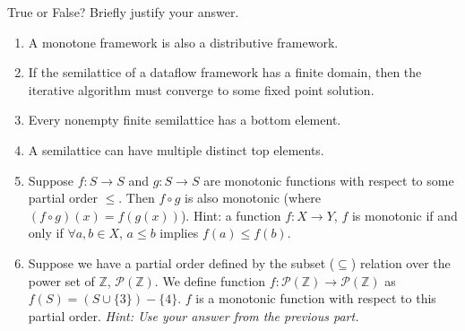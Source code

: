 \begin{problem}
True or False? Briefly justify your answer.
\begin{enumerate}
	\item A monotone framework is also a distributive framework.
	\item If the semilattice of a dataflow framework has a finite domain, then the iterative algorithm must converge to some fixed point solution.
	\item Every nonempty finite semilattice has a bottom element.
	\item A semilattice can have multiple distinct top elements.
	\item Suppose $f : S \to S$ and $g : S \to S$ are monotonic functions with respect to some partial order $\le$. Then $f \circ g$ is also monotonic (where $(f \circ g)(x) = f(g(x))$).
	      Hint: a function $f : X \to Y$, $f$ is monotonic if and only if $\forall a, b \in X$, $a \le b$ implies $f(a) \le f(b)$.
	\item Suppose we have a partial order defined by the subset ($\subseteq$) relation over the power set of $\mathbb{Z}$, $\mathcal{P}(\mathbb{Z})$. We define function $f : \mathcal{P}(\mathbb{Z}) \to \mathcal{P}(\mathbb{Z})$ as $f(S) = (S \cup \{3\}) - \{4\}$. $f$ is a monotonic function with respect to this partial order. \emph{Hint: Use your answer from the previous part.}
\end{enumerate}


\end{problem}
